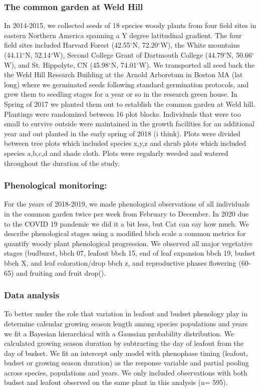 \documentclass[12 pt]{article}
\begin{document}
\subsubsection{The common garden at Weld Hill}
In 2014-2015, we collected seeds of 18 species woody plants from four field sites in eastern Northern America spanning a Y degree latitudinal gradient. The four field sites included Harvard Forest (42.55$^{\circ}$N, 72.20$^{\circ}$W), the White mountains (44.11$^{\circ}$N, 52.14$^{\circ}$W), Second College Grant of Dartmouth College (44.79$^{\circ}$N, 50.66$^{\circ}$W), and St. Hippolyte, CN (45.98$^{\circ}$N, 74.01$^{\circ}$W). We transported all seed back the the Weld Hill Research Building at the Arnold Arboretum in Boston MA (lat long) where we germinated seeds following standard germination protocols, and grew them to seedling stages for a year or so in the research green house. In Spring of 2017 we planted them out to establish the common garden at Weld hill. Plantings were randomized between 16 plot blocks. Individuals that were too small to survive outside were maintained in the growth facilities for an additional year and out planted in the early spring of 2018 (i think). Plots were divided between tree plots which included species x,y,z and shrub plots which included species a,b,c,d and shade cloth. Plots were regularly weeded and watered throughout the duration of the study.

\subsubsection{Phenological monitoring:}
For the years of 2018-2019, we made phenological observations of all individuals in the common garden twice per week from February to December. In 2020 due to the COVID 19 pandemic we did it a bit less, but Cat can say how much. We describe phenological stages using a modified bbch scale \citep{} a common metrics for quantify woody plant phenological progression. We observed all major vegetative stages (budburst, bbch 07, leafout bbch 15, end of leaf expansion bbch 19, budset bbch X, and leaf coloration/drop bbch z, and reproductive phases flowering (60-65) and fruiting and fruit drop(). 

\subsubsection{Data analysis}
To better under the role that variation in leafout and budset phenology play in determine calendar growing season length among species populations and years we fit a Bayesian hierarchical with a Gaussian probability distribution. We calculated growing season duration by subtracting the day of leafout from the day of budset. We fit an intercept only model with phenophase timing (leafout, budset or growing season duration) as the response variable and partial pooling across species, populations and years. We only included observations with both budset and leafout observed on the same plant in this analysis (n= 595).
\end{document}

